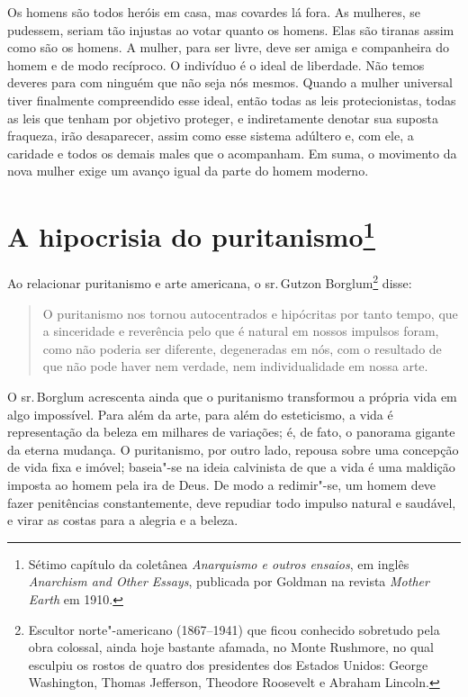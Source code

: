 Os homens são todos heróis em casa, mas covardes lá fora. As mulheres,
se pudessem, seriam tão injustas ao votar quanto os homens. Elas são tiranas assim como são os homens. A mulher, para ser livre, deve ser amiga e companheira do homem e de modo
recíproco. O indivíduo é o ideal de liberdade. Não temos deveres para com ninguém que não seja nós mesmos.
Quando a mulher universal tiver finalmente compreendido esse ideal,
então todas as leis protecionistas, todas as leis que tenham por objetivo
proteger, e indiretamente denotar sua suposta fraqueza, irão
desaparecer, assim como esse sistema adúltero e, com ele, a caridade e
todos os demais males que o acompanham. Em suma, o movimento da nova
mulher exige um avanço igual da parte do homem moderno.


\chapter{A hipocrisia do puritanismo\footnote{Sétimo capítulo da coletânea
  \textit{Anarquismo e outros ensaios}, em inglês \textit{Anarchism and Other Essays}, publicada por Goldman na revista \textit{Mother Earth} em 1910.}}\label{hipocrisia}

Ao relacionar puritanismo e arte americana, o sr.\,Gutzon Borglum\footnote{Escultor norte"-americano (1867--1941) que ficou conhecido sobretudo pela obra colossal, ainda hoje bastante afamada, no Monte Rushmore, no qual esculpiu os rostos de quatro dos presidentes dos Estados Unidos: George Washington, Thomas Jefferson, Theodore Roosevelt e Abraham Lincoln.} disse:

\begin{quote}
O puritanismo nos tornou autocentrados e hipócritas por tanto tempo,
que a sinceridade e reverência pelo que é natural em nossos impulsos
foram, como não poderia ser diferente, degeneradas em nós, com o
resultado de que não pode haver nem verdade, nem individualidade em
nossa arte.
\end{quote}

O sr.\,Borglum acrescenta ainda que o puritanismo transformou a própria vida
em algo impossível. Para além da arte, para além do esteticismo, a vida
é representação da beleza em milhares de variações; é, de fato, o
panorama gigante da eterna mudança. O puritanismo, por outro lado,
repousa sobre uma concepção de vida fixa e imóvel; baseia"-se na ideia
calvinista de que a vida é uma maldição imposta ao homem pela ira de
Deus. De modo a redimir"-se, um homem deve fazer penitências
constantemente, deve repudiar todo impulso natural e saudável, e virar
as costas para a alegria e a beleza.


